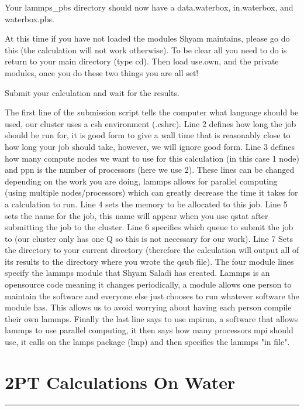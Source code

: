 \documentclass{article}
\begin{document}
\begin{enumerate}
 Your lammps\_pbs directory should now  have a data.waterbox, in.waterbox, and waterbox.pbs.

 At this time if you have not loaded the modules Shyam maintains, please go do this (the calculation will not work otherwise). 
 To be clear all you need to do is return to your main directory (type cd).
 Then load use.own, and the private modules, once you do these two things you are all set!
 
 Submit your calculation and wait for the results.

The first line of the submission script tells the computer what language should be used, our cluster uses a csh environment (.cshrc).
Line 2 defines how long the job should be run for, it is good form to give a wall time that is reasonably close to how long your job should take, however, we will ignore good form.
Line 3 defines how many compute nodes we want to use for this calculation (in this case 1 node) and ppn is the number of processors (here we use 2). 
These lines can be changed depending on the work you are doing, lammps allows for parallel computing (using multiple nodes/processors) which can greatly decrease the time it takes for a calculation to run. 
Line 4 sets the memory to be allocated to this job.
Line 5 sets the name for the job, this name will appear when you use qstat after submitting the job to the cluster. 
Line 6 specifies which queue to submit the job to (our cluster only has one Q so this is not necessary for our work).
Line 7 Sets the directory to your current directory (therefore the calculation will output all of its results to the directory where you wrote the qsub file). 
The four module lines specify the lammps module that Shyam Saladi has created. 
Lammps is an opensource code meaning it changes periodically, a module allows one person to maintain the software and everyone else just chooses to run whatever software the module has.
This allows us to avoid worrying about having each person compile their own lammps. 
Finally the last line says to use mpirun, a software that allows lammps to use parallel computing, it then says how many processors mpi should use, it calls on the lamps package (lmp) and then specifies the lammps "in file". 
\end{enumerate}

\section{2PT Calculations On Water}
\noindent\rule[0.5ex]{\linewidth}{1pt}\\
\end{document}
